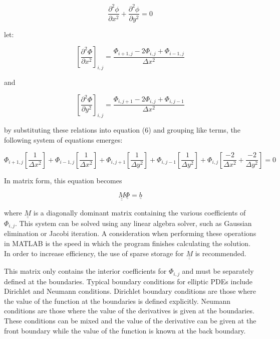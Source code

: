 \documentclass{article}
\begin{document}
      \begin{equation}
      \frac{\partial^2 \phi}{\partial x^2} + \frac{\partial^2 \phi}{\partial y^2} = 0
      \end{equation}
      
      let:
      
      \begin{equation}
      \left[\frac{\partial^2 \Phi}{\partial x^2}\right]_{i,j} = \frac{\Phi_{i+1,j} - 2\Phi_{i,j} + \Phi_{i-1,j}}{\Delta x^2}
      \end{equation}
      
      and
      
      \begin{equation}
      \left[\frac{\partial^2 \Phi}{\partial y^2}\right]_{i,j} = \frac{\Phi_{i,j+1} - 2\Phi_{i,j} + \Phi_{i,j-1}}{\Delta x^2}
      \end{equation}
      
      by substituting these relations into equation (6) and grouping like terms, the following system of equations emerges:
      
      \begin{equation}
      \Phi_{i+1,j}\left[\frac{1}{\Delta x^2}\right] + \Phi_{i-1,j}\left[\frac{1}{\Delta x^2}\right] +
      \Phi_{i,j+1}\left[\frac{1}{\Delta y^2}\right] +
      \Phi_{i,j-1}\left[\frac{1}{\Delta y^2}\right] +
      \Phi_{i,j}\left[\frac{-2}{\Delta x^2} + \frac{-2}{\Delta y^2}\right] = 0
      \end{equation}
      
      In matrix form, this equation becomes
      
      \begin{equation}
      \underline{\underline{M}} \underline{\Phi} = \underline{b}
      \end{equation}
      
      where $\underline{\underline{M}}$ is a diagonally dominant matrix containing the various coefficients of $\Phi_{i,j}$. This system can be solved using any linear algebra solver, such as Gaussian elimination or Jacobi iteration. A consideration when performing these operations in MATLAB is the speed in which the program finishes calculating the solution. In order to increase efficiency, the use of sparse storage for $\underline{\underline{M}}$ is recommended.
     \bigskip
      
      This matrix  only contains the interior coefficients for $\Phi_{i,j}$ and must be separately defined at the boundaries. Typical boundary conditions for elliptic PDEs include Dirichlet and Neumann conditions. Dirichlet boundary conditions are those where the value of the function at the boundaries is defined explicitly. Neumann conditions are those where the value of the derivatives is given at the boundaries. These conditions can be mixed and the value of the derivative can be given at the front boundary while the value of the function is known at the back boundary.
      \bigskip
      
\end{document}

